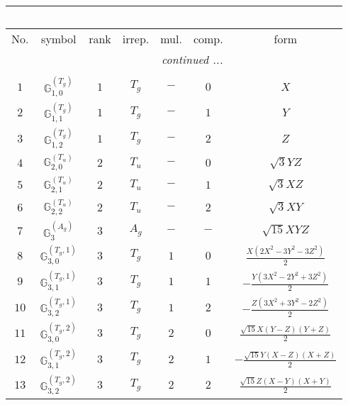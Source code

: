 \documentclass[fleqn,10pt,landscape]{article}
\begin{document}
\begin{itemize}
\begin{center}
\begin{longtable}{ccccccc}
\multicolumn{6}{l}{\tablename\ \thetable{}} \\
 \hline \hline
No. & symbol & rank & irrep. & mul. & comp. & form \\ \hline \endhead

 \hline \hline
\multicolumn{6}{r}{\footnotesize\it continued ...} \\ \endfoot

 \hline \hline
\multicolumn{6}{r}{} \\ \endlastfoot

$ 1 $ & $ \mathbb{G}_{1,0}^{(T_{g})} $ & $ 1 $ & $ T_{g} $ & $ - $ & $ 0 $ & $ X $ \\
$ 2 $ & $ \mathbb{G}_{1,1}^{(T_{g})} $ & $ 1 $ & $ T_{g} $ & $ - $ & $ 1 $ & $ Y $ \\
$ 3 $ & $ \mathbb{G}_{1,2}^{(T_{g})} $ & $ 1 $ & $ T_{g} $ & $ - $ & $ 2 $ & $ Z $ \\ \hline
$ 4 $ & $ \mathbb{G}_{2,0}^{(T_{u})} $ & $ 2 $ & $ T_{u} $ & $ - $ & $ 0 $ & $ \sqrt{3} Y Z $ \\
$ 5 $ & $ \mathbb{G}_{2,1}^{(T_{u})} $ & $ 2 $ & $ T_{u} $ & $ - $ & $ 1 $ & $ \sqrt{3} X Z $ \\
$ 6 $ & $ \mathbb{G}_{2,2}^{(T_{u})} $ & $ 2 $ & $ T_{u} $ & $ - $ & $ 2 $ & $ \sqrt{3} X Y $ \\ \hline
$ 7 $ & $ \mathbb{G}_{3}^{(A_{g})} $ & $ 3 $ & $ A_{g} $ & $ - $ & $ - $ & $ \sqrt{15} X Y Z $ \\
$ 8 $ & $ \mathbb{G}_{3,0}^{(T_{g},1)} $ & $ 3 $ & $ T_{g} $ & $ 1 $ & $ 0 $ & $ \frac{X \left(2 X^{2} - 3 Y^{2} - 3 Z^{2}\right)}{2} $ \\
$ 9 $ & $ \mathbb{G}_{3,1}^{(T_{g},1)} $ & $ 3 $ & $ T_{g} $ & $ 1 $ & $ 1 $ & $ - \frac{Y \left(3 X^{2} - 2 Y^{2} + 3 Z^{2}\right)}{2} $ \\
$ 10 $ & $ \mathbb{G}_{3,2}^{(T_{g},1)} $ & $ 3 $ & $ T_{g} $ & $ 1 $ & $ 2 $ & $ - \frac{Z \left(3 X^{2} + 3 Y^{2} - 2 Z^{2}\right)}{2} $ \\
$ 11 $ & $ \mathbb{G}_{3,0}^{(T_{g},2)} $ & $ 3 $ & $ T_{g} $ & $ 2 $ & $ 0 $ & $ \frac{\sqrt{15} X \left(Y - Z\right) \left(Y + Z\right)}{2} $ \\
$ 12 $ & $ \mathbb{G}_{3,1}^{(T_{g},2)} $ & $ 3 $ & $ T_{g} $ & $ 2 $ & $ 1 $ & $ - \frac{\sqrt{15} Y \left(X - Z\right) \left(X + Z\right)}{2} $ \\
$ 13 $ & $ \mathbb{G}_{3,2}^{(T_{g},2)} $ & $ 3 $ & $ T_{g} $ & $ 2 $ & $ 2 $ & $ \frac{\sqrt{15} Z \left(X - Y\right) \left(X + Y\right)}{2} $ \\
\end{longtable}
\end{center}


\end{itemize}
\end{document}
